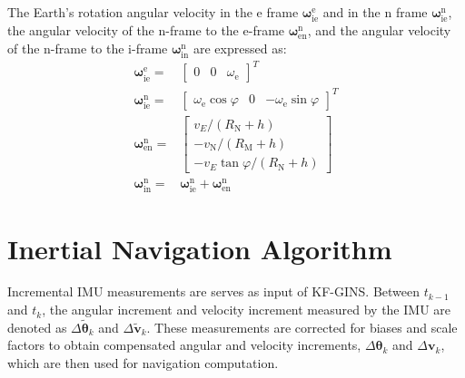 \documentclass{article}
\begin{document}
The Earth's rotation angular velocity in the $\mathrm{e}$ frame $\boldsymbol{\omega}_{\mathrm{ie}}^{\mathrm{e}}$ and in the $\mathrm{n}$ frame $\boldsymbol{\omega}_{\mathrm{ie}}^{\mathrm{n}}$, the angular velocity of the $\mathrm{n}$-frame to the $\mathrm{e}$-frame $\boldsymbol{\omega}_{\mathrm{en}}^{\mathrm{n}}$, and the angular velocity of the $\mathrm{n}$-frame to the $\mathrm{i}$-frame $\boldsymbol{\omega}_{\mathrm{in}}^{\mathrm{n}}$ are expressed as:
\begin{equation}
    \begin{aligned}
        \boldsymbol{\omega}_{\mathrm{ie}}^{\mathrm{e}} = & \left[ \begin{matrix} 0 & 0 & \omega_{\mathrm{e}} \end{matrix} \right]^{T} \\
        \boldsymbol{\omega}_{\mathrm{ie}}^{\mathrm{n}} = & \left[ \begin{matrix} \omega_{\mathrm{e}} \cos \varphi & 0 & -\omega_{\mathrm{e}} \sin \varphi \end{matrix} \right]^{T} \\
        \boldsymbol{\omega}_{\mathrm{en}}^{\mathrm{n}} = & \left[ \begin{matrix} {v}_{E}/({R}_{\mathrm{N}} + h) \\
        -{v}_{\mathrm{N}}/({R}_{\mathrm{M}} + h)\\
        -{v}_{E} \tan{\varphi}/({R}_{\mathrm{N}} + h) \end{matrix} \right] \\ 
        \boldsymbol{\omega}_{\mathrm{in}}^{\mathrm{n}} = & \boldsymbol{\omega}_{\mathrm{ie}}^{\mathrm{n}} + \boldsymbol{\omega}_{\mathrm{en}}^{\mathrm{n}}
    \end{aligned}
    \label{eq:angular-velocity-relative-to-nframe-and-earth}
\end{equation}

\section{Inertial Navigation Algorithm}

Incremental IMU measurements are serves as input of KF-GINS. Between $t_{k-1}$ and $t_k$, the angular increment and velocity increment measured by the IMU are denoted as $\Delta \tilde{\boldsymbol{\theta}}_{k}$ and $\Delta \tilde{\boldsymbol{v}}_{k}$. These measurements are corrected for biases and scale factors to obtain compensated angular and velocity increments, $\Delta \boldsymbol{\theta}_{k}$ and $\Delta \boldsymbol{v}_{k}$, which are then used for navigation computation.
\end{document}

